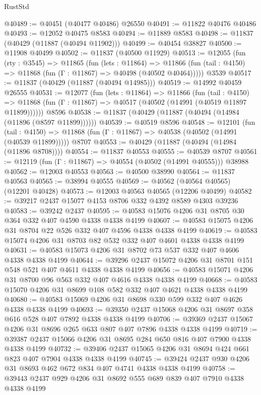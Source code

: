 \begin{lexlean}{RustStd}
\begin{coremodule}
@40489 := @40451 (@40477 @40486) @26550
@40491 := @11822 @40476 @40486
@40493 := @12052 @40475 @8583
@40494 := @11889 @8583
@40498 := @11837 (@40429 (@11887 (@40494 @11902)))
@40499 := @40454 @38827
@40500 := @11908 @40499
@40502 := @11837 (@40500 @11929)
@40513 := @12055
    (fun (rty : @3545) =>
    @11865
      (fun (lets : @11864) =>
      @11866 (fun (tail : @4150) => @11868 (fun (Γ : @11867) => @40498 (@40502 @40464)))))
    @3539
@40517 := @11837 (@40429 (@11887 (@40494 @14985)))
@40519 := @14992 @40459 @26555
@40531 := @12077
    (fun (lets : @11864) =>
    @11866
      (fun (tail : @4150) =>
      @11868 (fun (Γ : @11867) => @40517 (@40502 (@14991 (@40519 @11897 @11899))))))
    @8596
@40538 := @11837 (@40429 (@11887 (@40494 (@14984 (@11896 (@8597 @11899))))))
@40539 := @40519 @8596
@40548 := @12101
    (fun (tail : @4150) => @11868 (fun (Γ : @11867) => @40538 (@40502 (@14991 (@40539 @11899)))))
    @8707
@40553 := @40429 (@11887 (@40494 (@14984 (@11896 @8708))))
@40554 := @11837 @40553
@40555 := @40539 @8707
@40561 := @12119 (fun (Γ : @11867) => @40554 (@40502 (@14991 @40555))) @38988
@40562 := @12003 @40553
@40563 := @40500 @38990
@40564 := @11837 @40563
@40565 := @38994 @40555
@40569 := @40562 (@40564 @40565) (@12201 @40428)
@40573 := @12003 @40563 @40565 (@12206 @40499)
@40582 := @39217 @2437 @15077 @4153 @8706 @332 @4392 @8589 @4303 @39236
@40583 := @39242 @2437
@40595 := @40583 @15076 @4206 @31 @8705 @30 @364 @332 @407 @4590 @4338 @4338 @4199
@40607 := @40583 @15075 @4206 @31 @8704 @22 @526 @332 @407 @4596 @4338 @4338 @4199
@40619 := @40583 @15074 @4206 @31 @8703 @82 @532 @332 @407 @4601 @4338 @4338 @4199
@40631 := @40583 @15073 @4206 @31 @8702 @73 @537 @332 @407 @4606 @4338 @4338 @4199
@40644 := @39296 @2437 @15072 @4206 @31 @8701 @151 @548 @521 @407 @4611 @4338 @4338 @4199
@40656 := @40583 @15071 @4206 @31 @8700 @96 @563 @332 @407 @4616 @4338 @4338 @4199
@40668 := @40583 @15070 @4206 @31 @8699 @108 @582 @332 @407 @4621 @4338 @4338 @4199
@40680 := @40583 @15069 @4206 @31 @8698 @330 @599 @332 @407 @4626 @4338 @4338 @4199
@40693 := @39350 @2437 @15068 @4206 @31 @8697 @358 @616 @528 @407 @7892 @4338 @4338 @4199
@40706 := @39369 @2437 @15067 @4206 @31 @8696 @265 @633 @807 @407 @7896 @4338 @4338 @4199
@40719 := @39387 @2437 @15066 @4206 @31 @8695 @284 @650 @816 @407 @7900 @4338 @4338 @4199
@40732 := @39406 @2437 @15065 @4206 @31 @8694 @424 @661 @823 @407 @7904 @4338 @4338 @4199
@40745 := @39424 @2437 @930 @4206 @31 @8693 @462 @672 @834 @407 @4741 @4338 @4338 @4199
@40758 := @39443 @2437 @929 @4206 @31 @8692 @555 @689 @839 @407 @7910 @4338 @4338 @4199

\end{coremodule}
\end{lexlean}
